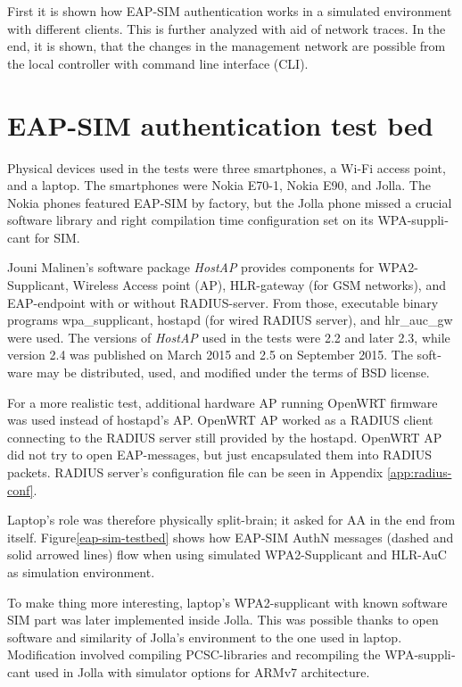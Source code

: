 \documentclass[12pt,a4paper,english]{tutthesis}
\begin{document}
\begin{otherlanguage}{english}
First it is shown how EAP-SIM authentication works in a simulated
environment with different clients.
This is further analyzed with aid of network traces.
In the end, it is shown, that the changes in the management network are possible from
the local controller with  command line interface (CLI).



\section{EAP-SIM authentication test bed}
\label{sec-5-1}



Physical devices used in the tests  were three smartphones, a Wi-Fi
access point, and a laptop.
The smartphones were Nokia E70-1, Nokia E90, and Jolla. The Nokia phones
featured EAP-SIM by factory, but the Jolla phone missed a crucial
software library
and right compilation time configuration set on its WPA-supplicant for SIM.

Jouni Malinen's software package \emph{HostAP} \cite{hostapd} provides
components for WPA2-Supplicant, Wireless Access point (AP),
HLR-gateway (for GSM networks), and EAP-endpoint with or without
RADIUS-server. From those, executable binary programs  wpa\_supplicant, hostapd (for wired RADIUS
server), and hlr\_auc\_gw  were used.  
The versions of \emph{HostAP} used in the tests were 2.2 and later 2.3,
while version 2.4 was published on March 2015 and 2.5 on September 2015. The software
may be distributed, used, and modified under the terms of BSD license.

For a more realistic test, additional hardware AP running OpenWRT
firmware was used instead of hostapd's AP. OpenWRT AP worked as a
RADIUS client connecting to the RADIUS server still provided by the
hostapd.  OpenWRT AP did not try to open EAP-messages, but just
encapsulated them into RADIUS packets.  RADIUS server's configuration
file can be seen in Appendix \ref{app:radius-conf}.


Laptop's role was therefore physically split-brain; it asked for AA in
the end from itself.
Figure\ref{eap-sim-testbed} shows how EAP-SIM AuthN messages (dashed
and solid arrowed lines) flow when using 
simulated WPA2-Supplicant and HLR-AuC as simulation environment.

To make thing more interesting, laptop's WPA2-supplicant with known
software SIM part was later implemented inside Jolla. This was
possible thanks to open software and similarity of Jolla's environment to
the one used in laptop. Modification involved compiling PCSC-libraries and
recompiling the WPA-supplicant used in Jolla with simulator options 
for ARMv7 architecture.




\end{otherlanguage}
\end{document}
